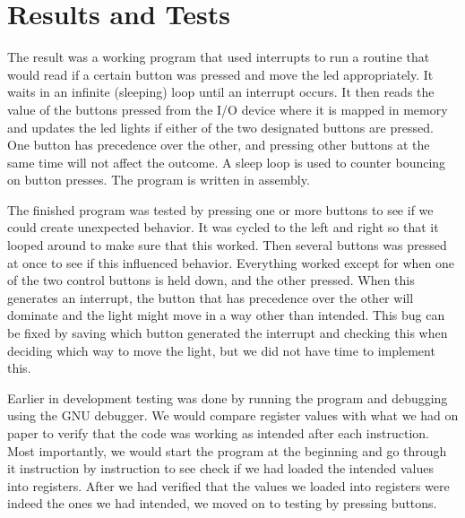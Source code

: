 \section{Results and Tests}


	The result was a working program that used interrupts to run a routine that would read if a certain button was pressed and move the led appropriately. It waits in an infinite (sleeping) loop until an interrupt occurs. It then reads the value of the buttons pressed from the I/O device where it is mapped in memory and updates the led lights if either of the two designated buttons are pressed. One button has precedence over the other, and pressing other buttons at the same time will not affect the outcome. A sleep loop is used to counter bouncing on button presses. The program is written in assembly.


The finished program was tested by pressing one or more buttons to see if we could create unexpected behavior. It was cycled to the left and right so that it looped around to make sure that this worked. Then several buttons was pressed at once to see if this influenced behavior. Everything worked except for when one of the two control buttons is held down, and the other pressed. When this generates an interrupt, the button that has precedence over the other will dominate and the light might move in a way other than intended. This bug can be fixed by saving which button generated the interrupt and checking this when deciding which way to move the light, but we did not have time to implement this.

Earlier in development testing was done by running the program and debugging using the GNU debugger. We would compare register values with what we had on paper to verify that the code was working as intended after each instruction. Most importantly, we would start the program at the beginning and go through it instruction by instruction to see check if we had loaded the intended values into registers. After we had verified that the values we loaded into registers were indeed the ones we had intended, we moved on to testing by pressing buttons.

